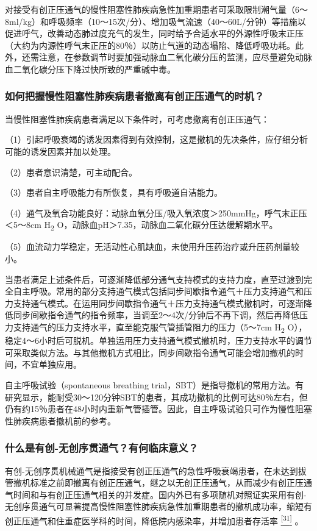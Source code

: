 对接受有创正压通气的慢性阻塞性肺疾病急性加重期患者可采取限制潮气量（6～8ml/kg）和呼吸频率（10～15次/分）、增加吸气流速（40～60L/分钟）等措施以促进呼气，改善动态肺过度充气的发生，同时给予合适水平的外源性呼吸末正压（大约为内源性呼气末正压的80％）以防止气道的动态塌陷、降低呼吸功耗。此外，还需注意，在参数调节时要加强动脉血二氧化碳分压的监测，应尽量避免动脉血二氧化碳分压下降过快所致的严重碱中毒。

\subsubsection{如何把握慢性阻塞性肺疾病患者撤离有创正压通气的时机？}

当慢性阻塞性肺疾病患者满足以下条件时，可考虑撤离有创正压通气：

（1）引起呼吸衰竭的诱发因素得到有效控制，这是撤机的先决条件，应仔细分析可能的诱发因素并加以处理。

（2）患者意识清楚，可主动配合。

（3）患者自主呼吸能力有所恢复，具有呼吸道自洁能力。

（4）通气及氧合功能良好：动脉血氧分压/吸入氧浓度＞250mmHg，呼气末正压＜5～8cm
H\textsubscript{2} O，动脉血pH＞7.35，动脉血二氧化碳分压达缓解期水平。

（5）血流动力学稳定，无活动性心肌缺血，未使用升压药治疗或升压药剂量较小。

当患者满足上述条件后，可逐渐降低部分通气支持模式的支持力度，直至过渡到完全自主呼吸。常用的部分支持通气模式包括同步间歇指令通气＋压力支持通气和压力支持通气模式。在运用同步间歇指令通气＋压力支持通气模式撤机时，可逐渐降低同步间歇指令通气的指令频率，当调至2～4次/分钟后不再下调，然后再降低压力支持通气的压力支持水平，直至能克服气管插管阻力的压力（5～7cm
H\textsubscript{2}
O），稳定4～6小时后可脱机。单独运用压力支持通气模式撤机时，压力支持水平的调节可采取类似方法。与其他撤机方式相比，同步间歇指令通气可能会增加撤机的时间，不宜单独应用。

自主呼吸试验（spontaneous breathing
trial，SBT）是指导撤机的常用方法。有研究显示，能耐受30～120分钟SBT的患者，其成功撤机的比例可达80％左右，但仍有约15％患者在48小时内重新气管插管。因此，自主呼吸试验只可作为慢性阻塞性肺疾病患者撤机前的参考。

\subsubsection{什么是有创-无创序贯通气？有何临床意义？}

有创-无创序贯机械通气是指接受有创正压通气的急性呼吸衰竭患者，在未达到拔管撤机标准之前即撤离有创正压通气，继之以无创正压通气，从而减少有创正压通气时间和与有创正压通气相关的并发症。国内外已有多项随机对照证实采用有创-无创序贯通气可显著提高慢性阻塞性肺疾病急性加重期患者的撤机成功率，缩短有创正压通气和住重症医学科的时间，降低院内感染率，并增加患者存活率
\protect\hyperlink{text00012.htmlux5cux23ch31-11}{\textsuperscript{{[}31{]}}}
。

